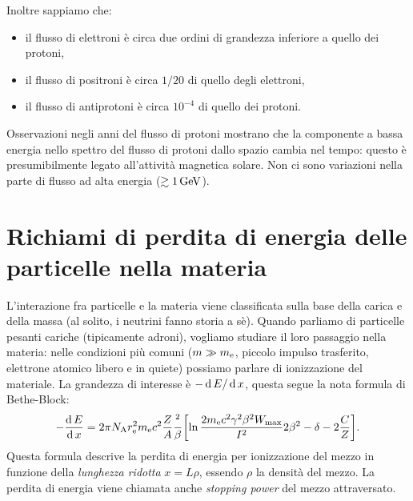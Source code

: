 Inoltre sappiamo che:
\begin{itemize}
    \item il flusso di elettroni è circa due ordini di grandezza inferiore a quello dei protoni,
    \item il flusso di positroni è circa $1/20$ di quello degli elettroni,
    \item il flusso di antiprotoni è circa $10^{-4}$ di quello dei protoni.
\end{itemize}
Osservazioni negli anni del flusso di protoni mostrano che la componente a bassa energia nello spettro del flusso di protoni dallo spazio cambia nel tempo: questo è presumibilmente legato all'attività magnetica solare. Non ci sono variazioni nella parte di flusso ad alta energia ($\gtrsim 1\,\textup{GeV}$).

\section{Richiami di perdita di energia delle particelle nella materia}

L'interazione fra particelle e la materia viene classificata sulla base della carica e della massa (al solito, i neutrini
fanno storia a sè). Quando parliamo di particelle pesanti cariche (tipicamente adroni), vogliamo studiare il loro passaggio nella materia: nelle condizioni più comuni ($m \gg m_\textup{e}$, piccolo impulso trasferito, elettrone atomico libero e in quiete) possiamo parlare di ionizzazione del materiale. La grandezza di interesse è $-\operatorname{d} E / \operatorname{d} x$, questa segue la nota formula di Bethe-Block:
\begin{equation*}
    -\frac{\operatorname{d} E}{\operatorname{d} x} = 2\pi N_\textup{A} r_\textup{e}^2 m_\textup{e} c^2 \frac{Z}{A} \frac{^2}{\beta} \biggl[ \ln \frac{2m_\textup{e}c^2 \gamma^2 \beta^2 W_\textup{max}}{I^2} 2\beta^2 - \delta - 2\frac{C}{Z}\biggr].
\end{equation*}
Questa formula descrive la perdita di energia per ionizzazione del mezzo in funzione della \emph{lunghezza ridotta} $x = L\rho$, essendo $\rho$ la densità del mezzo. La perdita di energia viene chiamata anche \emph{stopping power} del mezzo attraversato.

